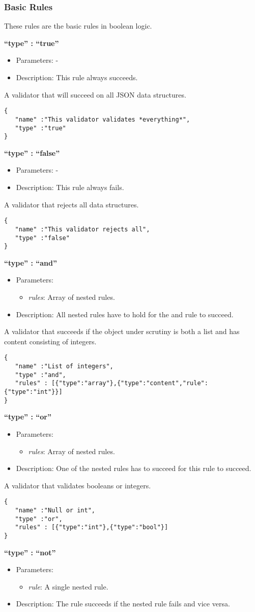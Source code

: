 \documentclass[a4paper]{article}
\newcommand{\ruledef}[3]{
\medskip
\textbf{#1}

\begin{itemize}
\setlength{\itemsep}{1pt}
\setlength{\parskip}{0pt}
\setlength{\parsep}{0pt}
   \item Parameters: #2
   \item Description: #3
\end{itemize}
}
\newcommand{\rulename}[1]{\textbf{``type'' : ``#1''}}
\newcommand{\param}[1]{\textsl{#1}:}
\begin{document}
\subsubsection{Basic Rules}

These rules are the basic rules in boolean logic. 

\ruledef{\rulename{true}}{-}{This rule always succeeds.}

A validator that will succeed on all JSON data structures.	
\begin{lstlisting}
{
   "name" :"This validator validates *everything*",
   "type" :"true"
}
\end{lstlisting}

\ruledef{\rulename{false}}{-}{This rule always fails.}

A validator that rejects all data structures.
\begin{lstlisting}
{
   "name" :"This validator rejects all",
   "type" :"false"
}
\end{lstlisting}

\label{and}
\ruledef{\rulename{and}}{\begin{itemize} \item \param{rules} Array of nested rules. \end{itemize}}{All nested rules have to hold for the and rule to succeed.}

A validator that succeeds if the object under scrutiny is both a list and has content consisting of integers.
\begin{lstlisting}
{
   "name" :"List of integers",
   "type" :"and",
   "rules" : [{"type":"array"},{"type":"content","rule":{"type":"int"}}]
}
\end{lstlisting}

\ruledef{\rulename{or}}{\begin{itemize} \item \param{rules} Array of nested rules.\end{itemize}}{One of the nested rules has to succeed for this rule to succeed.}

A validator that validates booleans or integers.
\begin{lstlisting}
{
   "name" :"Null or int",
   "type" :"or",
   "rules" : [{"type":"int"},{"type":"bool"}]
}
\end{lstlisting}

\ruledef{\rulename{not}}{\begin{itemize} \item \param{rule} A single nested rule. \end{itemize}}{The rule succeeds if the nested rule fails and vice versa.}
\end{document}
